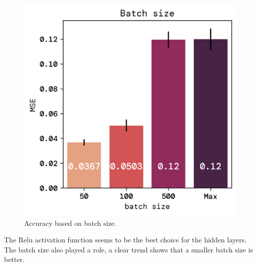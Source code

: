 \documentclass[twoside,11pt]{report}
\begin{document}
\begin{figure}[!ht]
\begin{minipage}[t]{0.5\textwidth - 1mm}
\begin{center}
                \includegraphics[width=\textwidth]{../runsAndFigures/MSE_batch.png}
            \end{center}
            \caption
            {
                Accuracy based on batch size.
            }\label{fig:MSE_batch}
        \end{minipage}
    \end{figure}

    \noindent
    The Relu activation function seems to be the best choice for the hidden layers.
    The batch size also played a role, a clear trend shows that a smaller batch size is better.
\end{document}
